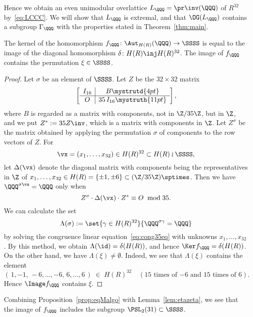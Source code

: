 \documentclass{amsart}
\begin{document}
%
Hence we obtain an even unimodular overlattice $L_{\QQQ}=\pr\inv(\QQQ)$ of $R^{32}$
by~\eqref{eq:LCCC}.
We will show that  $L_{\QQQ}$ is extremal, 
and that $\OG(L_{\QQQ})$ contains 
a subgroup $\Gamma_{\QQQ}$ with  the properties stated in Theorem~\ref{thm:main}.
%
\begin{proposition}\label{prop:eqMalgo}
The kernel of the homomorphism
$f_{\QQQ}\colon \Aut_{H(R)} (\QQQ)\to \SSSS$ 
is equal to the image of the diagonal homomorphism
$\delta\colon H(R)\inj H(R)^{32}$.
The image of $f_{\QQQ}$ contains the permutation $\xi\in \SSSS$.
\end{proposition}
%
\begin{proof}
Let $\sigma$ be an element of $\SSSS$.
Let $Z$ be the $32\times 32$ matrix
$$
\left[
\begin{array}{c|c}
I_{16} & B \mystrutd{4pt} \\
\hline
O & 35\, I_{16}\mystruth{11pt}
\end{array}
\right],
$$
where $B$ is regarded as a matrix with components, not in $\Z/35\Z$, but in $\Z$,
and we put 
$Z^{*}:=35 Z\inv$,
which is a matrix with components in $\Z$.
Let $Z^{\sigma}$ be the matrix obtained by applying the permutation $\sigma$ of components
to the row vectors of $Z$.
For 
$$
\vx=(x_1, \dots, x_{32}) \in H(R)^{32}\subset H(R)\wr \SSSS, 
$$
let $\Delta(\vx)$ denote the diagonal matrix with components being the representatives in $\Z$ of $x_1, \dots, x_{32}\in H(R)=\{\pm 1, \pm 6\}\subset (\Z/35\Z)\sptimes$.
Then we have $\QQQ^{\sigma\vx}=\QQQ$ only when
%
\begin{equation}\label{eq:cong35eq}
Z^{\sigma} \cdot \Delta(\vx)\cdot Z^{*}\equiv O \; \bmod 35.
\end{equation}
%
We can calculate the set
$$
\Lambda(\sigma):=\set{\gamma\in H(R)^{32}}{\QQQ^{\sigma \gamma}=\QQQ}
$$
by solving the congruence linear equation~\eqref{eq:cong35eq}
with unknowns $x_1, \dots, x_{32}$.
By this method, we obtain  
$\Lambda(\id)=\delta(H(R))$, and hence $\Ker f_{\QQQ}=\delta(H(R))$.
On the other hand, we have $\Lambda(\xi)\ne \emptyset$. 
Indeed, we see that $\Lambda(\xi)$ contains the element %
$$
(\,1, -1, \, -6, \dots, -6, \, 6, \dots, 6\,) \;\in\; H(R)^{32} \quad (\textrm{$15$ times  of $-6$ and $15$ times of $6$}).
$$
Hence $\Image f_{\QQQ}$ contains $\xi$.
\end{proof}
%
Combining Proposition~\ref{prop:eqMalgo} with  Lemma~\ref{lem:etazeta}, we see that 
the image of $f_{\QQQ}$ includes the subgroup $\PSL_2(31)\subset \SSSS$.
\end{document}
